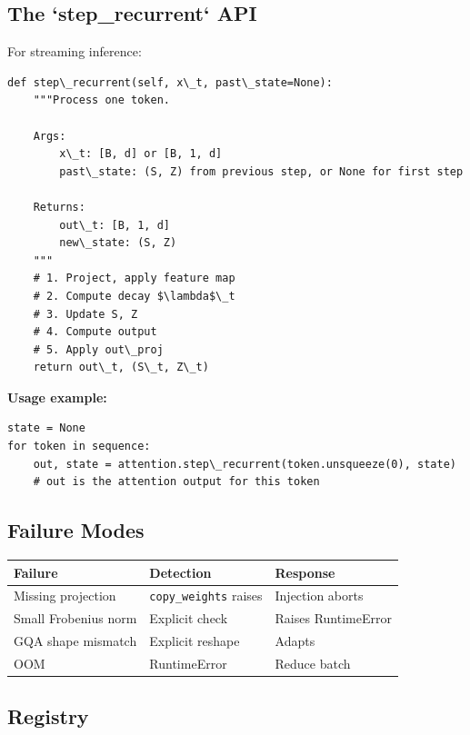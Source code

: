 \subsection{The `step\_recurrent` API}

For streaming inference:

\begin{lstlisting}
def step\_recurrent(self, x\_t, past\_state=None):
    """Process one token.
    
    Args:
        x\_t: [B, d] or [B, 1, d]
        past\_state: (S, Z) from previous step, or None for first step
    
    Returns:
        out\_t: [B, 1, d]
        new\_state: (S, Z)
    """
    # 1. Project, apply feature map
    # 2. Compute decay $\lambda$\_t
    # 3. Update S, Z
    # 4. Compute output
    # 5. Apply out\_proj
    return out\_t, (S\_t, Z\_t)
\end{lstlisting}

\textbf{Usage example:}

\begin{lstlisting}
state = None
for token in sequence:
    out, state = attention.step\_recurrent(token.unsqueeze(0), state)
    # out is the attention output for this token
\end{lstlisting}

\subsection{Failure Modes}

\begin{table}[H]
\centering
\small
\begin{tabular}{lll}
\toprule
\textbf{Failure} & \textbf{Detection} & \textbf{Response} \\
\midrule
Missing projection & \texttt{copy\_weights} raises & Injection aborts \\
Small Frobenius norm & Explicit check & Raises RuntimeError \\
GQA shape mismatch & Explicit reshape & Adapts \\
OOM & RuntimeError & Reduce batch \\
\bottomrule
\end{tabular}
\end{table}

\subsection{Registry}

